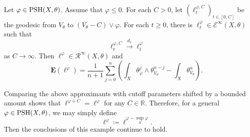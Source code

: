 \begin{example}\label{ex:rayasspsh}
    Let $\varphi\in \mathrm{PSH}(X,\theta)$. Assume that $\varphi\leq 0$.
    For each $C>0$, let $(\ell^{\varphi,C}_t)_{t\in [0,C]}$ be the geodesic from $V_{\theta}$ to $(V_{\theta}-C)\lor \varphi$. For each $t\geq 0$, there is $\ell^{\varphi}_t\in \mathcal{E}^{\infty}(X,\theta)$ such that
    \begin{equation}\label{eq:ellvarphiraydef}
        \ell^{\varphi,C}_t\xrightarrow{d_1}\ell^{\varphi}_t
    \end{equation}
    as $C\to \infty$.
    Then $\ell^{\varphi}\in \mathcal{R}^{\infty}(X,\theta)$ and
\begin{equation}\label{eq:Elphi}
\mathbf{E}(\ell^{\varphi})=\frac{1}{n+1} \sum_{j=0}^n \left(\int_X \theta_{\varphi}^j\wedge \theta_{V_{\theta}}^{n-j}-\int_X \theta_{V_{\theta}}^n\right).
\end{equation}
\end{example}
Comparing the above approximants with cutoff parameters shifted by a bounded amount shows that $\ell^{\varphi+C}=\ell^{\varphi}$ for any $C\in \mathbb{R}$. Therefore, for a general $\varphi\in \mathrm{PSH}(X,\theta)$, we may simply define
\[
\ell^{\varphi}\coloneqq \ell^{\varphi-\sup_X\varphi}.
\]
Then the conclusions of this example continue to hold.
